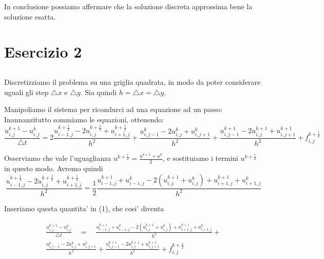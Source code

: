 \documentclass[]{article}
\begin{document}
\noindent In conclusione possiamo affermare che la soluzione discreta approssima bene la soluzione esatta.\\





\section{Esercizio 2}

\subsection{}
Discretizziamo il problema su una griglia quadrata, in modo da poter considerare uguali gli step $\bigtriangleup x$ e $\bigtriangleup y$. Sia quindi $h = \bigtriangleup x = \bigtriangleup y $.

Manipoliamo il sistema per ricondurci ad una equazione ad un passo:
Inannanzitutto sommiamo le equazioni, ottenendo:
\begin{equation}
\frac{u^{k+1}_{i,j}-u^k_{i,j}}{\bigtriangleup t} = 2 \frac{u^{k+\frac{1}{2}}_{i-1,j} -2u^{k+\frac{1}{2}}_{i,j} + u^{k+\frac{1}{2}}_{i+1,j}}{h^2} + \frac{u^{k}_{i,j-1} -2u^{k}_{i,j} + u^{k}_{i,j+1}}{h^2} + \frac{u^{k+1}_{i,j-1} -2u^{k+1}_{i,j} + u^{k+1}_{i,j+1}}{h^2} + f^{k+\frac{1}{2}}_{i,j}
\end{equation}

Osserviamo che vale l'uguaglianza $u^{k+\frac{1}{2}} = \frac{ u^{k+1}+ u^{k}}{2}$, e sostituiamo i termini $u^{k+\frac{1}{2}}$ in questo modo. Avremo quindi
\begin{equation}
\frac{u^{k+\frac{1}{2}}_{i-1,j} -2u^{k+\frac{1}{2}}_{i,j} + u^{k+\frac{1}{2}}_{i+1,j}}{h^2} = \frac{1}{2} \frac{u^{k+1}_{i-1,j} + u^{k}_{i-1,j} - 2(u^{k+1}_{i,j} + u^{k}_{i,j}) + u^{k+1}_{i+1,j} + u^{k}_{i+1,j}}{h^2}
\end{equation}

Inseriamo questa quantita' in (1), che cosi' diventa

\begin{equation}
\begin{split}
\frac{u^{k+1}_{i,j}-u^k_{i,j}}{\bigtriangleup t} \quad = \quad  \frac{u^{k+1}_{i-1,j} + u^{k}_{i-1,j} - 2(u^{k+1}_{i,j} + u^{k}_{i,j}) + u^{k+1}_{i+1,j} + u^{k}_{i+1,j}}{h^2} +\\ \frac{u^{k}_{i,j-1} -2u^{k}_{i,j} + u^{k}_{i,j+1}}{h^2} + \frac{u^{k+1}_{i,j-1} -2u^{k+1}_{i,j} + u^{k+1}_{i,j+1}}{h^2} + f^{k+\frac{1}{2}}_{i,j}
\end{split}
\end{equation}
\end{document}
